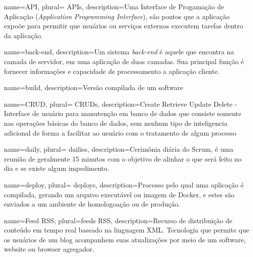 


 {
    name=API,
    plural= {APIs},
    description={Uma Interface de Progamação de Aplicação (\emph{Application Programming Interface}), são pontos que a
    aplicação expoõe para permitir que usuários ou serviços externos
    executem tarefas dentro da aplicação.}
}

 {
    name={back-end},
    description={Um sistema \emph{back-end} é aquele que encontra na
    camada de servidor, em uma aplicação de duas camadas. Sua
    principal função é fornecer informações e capacidade de
    processamento a aplicação cliente.}
}

 {
    name={build},
    description={Versão compilada de um software}
}


 {
    name=CRUD,
    plural= {CRUDs},
    description={Create Retrieve Update Delete - Interface de usuário para manutenção em banco de dados que consiste somente nas operações básicas do banco de dados, sem nenhum tipo de inteligencia adicional de forma a facilitar ao usuário com o tratamento de algum processo}
}

 {
    name=daily,
		plural= {dailies},
    description={Cerimônia diária do Scrum, é uma reunião de geralmente 15 minutos com o objetivo de alinhar o que será feito no dia e se existe algum impedimento.}
}

 {
    name=deploy,
    plural= {deploys},
    description={Processo pelo qual uma aplicação é compilada, gerando
      um arquivo executável ou imagem de Docker, e estes são enviados a
      um ambiente de homologoação ou de produção.}
}

 {
	name={Feed RSS},
	plural={feeds RSS},
	description={Recurso de distribuição de conteúdo em tempo real baseado na linguagem XML. Tecnologia que permite que os usuários de um blog acompanhem suas atualizações por meio de um software, website ou browser agregador.}
}

